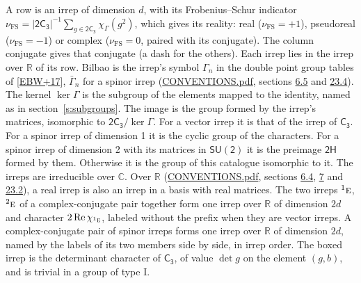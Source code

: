 \documentclass[10pt,a4paper]{article}
\numberwithin{equation}{section}
\newcommand{\grp}[1]{\mathsf{#1}}
\newcommand{\irr}[1]{\text{\normalfont\scshape #1}}
\newcommand{\conjpair}[1]{{}^{#1}}
\newcommand{\irchar}[1]{\chi_{#1}}
\newcommand{\fsind}{\nu_{\mathrm{FS}}}
\begin{document}
\leavevmode\label{n:index.frobenius}\label{n:head.irrep}\label{n:head.reality}A row is an irrep of dimension $d$, with its Frobenius--Schur indicator $\fsind = |\grp{2C_{3}}|^{-1}\allowbreak\sum_{g\in\grp{2C_{3}}}\irchar{\Gamma}(g^2)$, which gives its reality: real ($\fsind = +1$), pseudoreal ($\fsind = -1$) or complex ($\fsind = 0$, paired with its conjugate). \label{n:head.conjugate}The column conjugate gives that conjugate (a dash for the others). \label{n:head.over.real}Each irrep lies in the irrep over $\mathbb{R}$ of its row. \label{n:head.bilbao}\label{n:irrep.alias.gamma}Bilbao is the irrep's symbol $\Gamma_n$ in the double point group tables of [\href{../../../REFERENCES.pdf\#ref.EBW+17}{EBW+17}], $\bar{\Gamma}_n$ for a spinor irrep (\href{../../CONVENTIONS.pdf}{CONVENTIONS.pdf}, sections \href{../../../rotation/CONVENTIONS.pdf\#conv.6.5}{6.5} and \href{../../CONVENTIONS.pdf\#conv.23.4}{23.4}). \label{n:head.kernel}The kernel $\ker\Gamma$ is the subgroup of the elements mapped to the identity, named as in section~\ref{s:subgroups}. \label{n:head.image}The image is the group formed by the irrep's matrices, isomorphic to $\grp{2C_{3}}/\ker\Gamma$. For a vector irrep it is that of the irrep of \href{../../../rotation/data/pdf/C3.pdf}{$\grp{C_{3}}$}. For a spinor irrep of dimension 1 it is the cyclic group of the characters. For a spinor irrep of dimension 2 with its matrices in $\grp{SU(2)}$ it is the preimage $\grp{2H}$ formed by them. Otherwise it is the group of this catalogue isomorphic to it. The irreps are irreducible over $\mathbb{C}$. Over $\mathbb{R}$ (\href{../../CONVENTIONS.pdf}{CONVENTIONS.pdf}, sections \href{../../../rotation/CONVENTIONS.pdf\#conv.6.4}{6.4}, \href{../../../rotation/CONVENTIONS.pdf\#conv.7}{7} and \href{../../CONVENTIONS.pdf\#conv.23.2}{23.2}), a real irrep is also an irrep in a basis with real matrices. The two irreps $\conjpair{1}\irr{e}$, $\conjpair{2}\irr{e}$ of a complex-conjugate pair together form one irrep over $\mathbb{R}$ of dimension $2d$ and character $2\operatorname{Re}\irchar{\conjpair{1}\irr{e}}$, labeled without the prefix when they are vector irreps. A complex-conjugate pair of spinor irreps forms one irrep over $\mathbb{R}$ of dimension $2d$, named by the labels of its two members side by side, in irrep order. \label{n:mark.determinant}The boxed irrep is the determinant character of \href{../../../rotation/data/pdf/C3.pdf}{$\grp{C_{3}}$}, of value $\det g$ on the element $(g, b)$, and is trivial in a group of type I.
\setlength{\emergencystretch}{2em}\par\setlength{\emergencystretch}{0pt}
\end{document}
